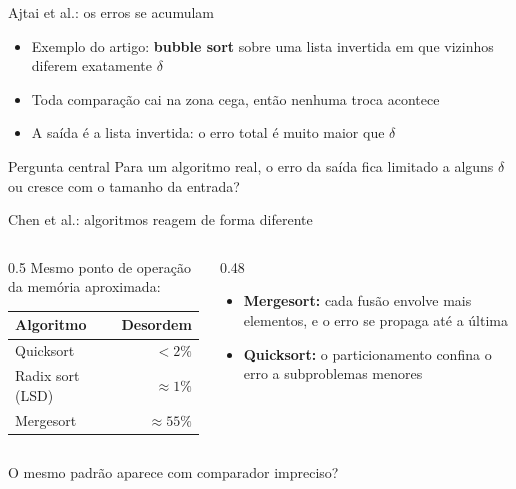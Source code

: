 \documentclass[aspectratio=169,10pt]{beamer}
\begin{document}
\begin{frame}{Ajtai et al.: os erros se acumulam}
  \begin{itemize}
    \item Exemplo do artigo: \textbf{bubble sort} sobre uma lista invertida em que vizinhos diferem exatamente $\delta$
    \item Toda comparação cai na zona cega, então nenhuma troca acontece
    \item A saída é a lista invertida: o erro total é muito maior que $\delta$
  \end{itemize}
  \vspace{0.6em}
  \begin{alertblock}{Pergunta central}
    Para um algoritmo real, o erro da saída fica limitado a alguns $\delta$
    ou cresce com o tamanho da entrada?
  \end{alertblock}
\end{frame}

\begin{frame}{Chen et al.: algoritmos reagem de forma diferente}
  \begin{columns}[c]
    \begin{column}{0.5\textwidth}
      Mesmo ponto de operação da memória aproximada:
      \vspace{0.4em}
      \begin{center}
        \begin{tabular}{lr}
          \toprule
          Algoritmo & Desordem \\
          \midrule
          Quicksort & $< 2\%$ \\
          Radix sort (LSD) & $\approx 1\%$ \\
          Mergesort & $\approx 55\%$ \\
          \bottomrule
        \end{tabular}
      \end{center}
    \end{column}
    \begin{column}{0.48\textwidth}
      \begin{itemize}
        \item \textbf{Mergesort:} cada fusão envolve mais elementos, e o erro se propaga até a última
        \item \textbf{Quicksort:} o particionamento confina o erro a subproblemas menores
      \end{itemize}
    \end{column}
  \end{columns}
  \vspace{0.6em}
  \begin{center}
    O mesmo padrão aparece com comparador impreciso?
  \end{center}
\end{frame}
\end{document}
